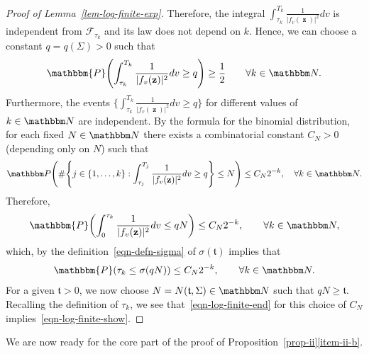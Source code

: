 \documentclass[11pt]{article}
\theoremstyle{plain}
\theoremstyle{definition}
\numberwithin{equation}{section}
\newcommand{\eqb}{\begin{equation}}
\newcommand{\eqe}{\end{equation}}
\newcommand{\eqbn}{\begin{equation*}}
\newcommand{\eqen}{\end{equation*}}
\newcommand{\BB}{\mathbbm}
\newcommand{\op}{\operatorname}
\newcommand{\mcl}{\mathcal}
\newcommand{\zz}{{\op{\mathbf{z}}}}
\newcommand{\tz}{{\mathfrak t}}
\let\originalleft\left
\let\originalright\right
\renewcommand{\left}{\mathopen{}\mathclose\bgroup\originalleft}
\renewcommand{\right}{\aftergroup\egroup\originalright}
\begin{document}
\begin{proof}[Proof of Lemma~\ref{lem-log-finite-exp}]
Therefore, the integral $\int_{\tau_k}^{T_k} \frac{1}{|f_v(\zz)|^2} dv$ is independent from $\mcl F_{\tau_k}$ and its law does not depend on $k$.  Hence, we can choose a constant $q = q(\Sigma)  >0$ such that 
\eqbn
\BB{P}\left( \int_{\tau_k}^{T_k} \frac{1}{|f_v(\zz)|^2} dv \geq q \right) \geq \frac{1}{2} \qquad \forall k \in\BB N .
\eqen
Furthermore, the events $\{ \int_{\tau_k}^{T_k} \frac{1}{|f_v(\zz)|^2} dv \geq q\}$ for different values of $k\in\BB N$ are independent. 
By the formula for the binomial distribution, for each fixed $N\in\BB N$ there exists a combinatorial constant $C_N > 0$ (depending only on $N$) such that
\eqbn
\BB P\left( \#\left\{j \in \{1,\dots, k\} : \int_{\tau_j}^{T_j} \frac{1}{|f_v(\zz)|^2} dv \geq q \right\} \leq N \right) \leq C_N 2^{-k}  ,\quad\forall k \in \BB N .
\eqen
Therefore,  
\eqbn
\BB{P}\left( \int_{0}^{ \tau_k } \frac{1}{|f_v(\zz)|^2} dv \leq q N \right) \leq C_N 2^{-k },  \qquad \forall k \in\BB N ,
\eqen
which, by the definition~\eqref{eqn-defn-sigma} of $\sigma(\tz)$ implies that
\eqb \label{eqn-log-finite-end} 
\BB{P}\left( \tau_k \leq \sigma(q N ) \right)  \leq C_N 2^{-k } , \qquad \forall k \in\BB N.
\eqe
For a given $\tz > 0$, we now choose $N = N(\tz , \Sigma) \in \BB N$ such that $q N \geq \tz$. 
Recalling the definition of $\tau_k$, we see that~\eqref{eqn-log-finite-end} for this choice of $C_N$ implies~\eqref{eqn-log-finite-show}. 
\end{proof}




We are now ready for the core part of the proof of Proposition~\hyperref[item-ii-b]{\ref*{prop-ii}\ref*{item-ii-b}}. 
\end{document}
